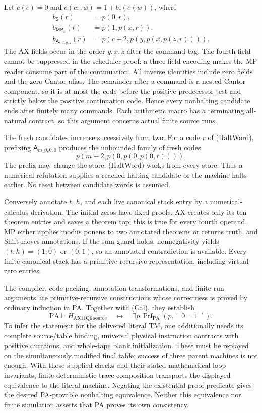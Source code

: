 Let $e(\epsilon)=0$ and $e(c::w)=1+b_c(e(w))$, where
\[
 \begin{aligned}
 b_{\mathsf S}(r)&=p(0,r),\\
 b_{\mathsf{MP}_x}(r)&=p(1,p(x,r)),\\
 b_{\mathsf A_{c,x,y,z}}(r)&=p(c+2,p(y,p(x,p(z,r)))).
 \end{aligned}                                           \tag{Encode}
\]
The AX fields occur in the order $y,x,z$ after the command tag.
The fourth field cannot be suppressed in the scheduler proof: a
three-field encoding makes the MP reader consume part of the continuation.
All inverse identities include zero fields and the zero Cantor alias.
The remainder after a command is a nested Cantor component, so it is at
most the code before the positive predecessor test and strictly below
the positive continuation code.  Hence every nonhalting candidate ends
after finitely many commands.  Each arithmetic macro has a terminating
all-natural contract, so this argument concerns actual finite source runs.

The fresh candidates increase successively from two.  For a code $r$ of
(HaltWord), prefixing $\mathsf A_{m,0,0,0}$ produces the unbounded family
of fresh codes
\[
                    p(m+2,p(0,p(0,p(0,r)))).
\]
The prefix may change the store; (HaltWord) works from every store.
Thus a numerical refutation supplies a reached halting candidate or the
machine halts earlier.  No reset between candidate words is assumed.

Conversely annotate $t$, $h$, and each live canonical stack entry by a
numerical-calculus derivation.  The initial zeros have fixed proofs.
AX creates only its ten theorem entries and saves a theorem top; this is
true for every fourth operand.  MP either applies modus ponens to two
annotated theorems or returns truth, and Shift moves annotations.  If the
sum guard holds, nonnegativity yields $(t,h)=(1,0)$ or $(0,1)$, so an
annotated contradiction is available.  Every finite canonical stack has
a primitive-recursive representation, including virtual zero entries.

The compiler, code packing, annotation transformations, and finite-run
arguments are primitive-recursive constructions whose correctness is
proved by ordinary induction in PA.  Together with (Cal), they establish
\[
 \mathrm{PA}\vdash
 H_{\mathrm{AX11Q6\ source}}
 \quad\longleftrightarrow\quad
 \exists p\,\operatorname{Prf}_{\mathrm{PA}}(p,\ulcorner0=1\urcorner).
\]
To infer the statement for the delivered literal TM, one additionally
needs its complete source/table binding, universal physical instruction
contracts with positive durations, and whole-tape blank initialization.
These must be replayed on the simultaneously modified final table; success
of three parent machines is not enough.  With those supplied checks and
their stated mathematical loop invariants, finite deterministic trace
composition transports the displayed equivalence to the literal machine.
Negating the existential proof predicate gives the desired PA-provable
nonhalting equivalence.  Neither this equivalence nor finite simulation
asserts that PA proves its own consistency.
